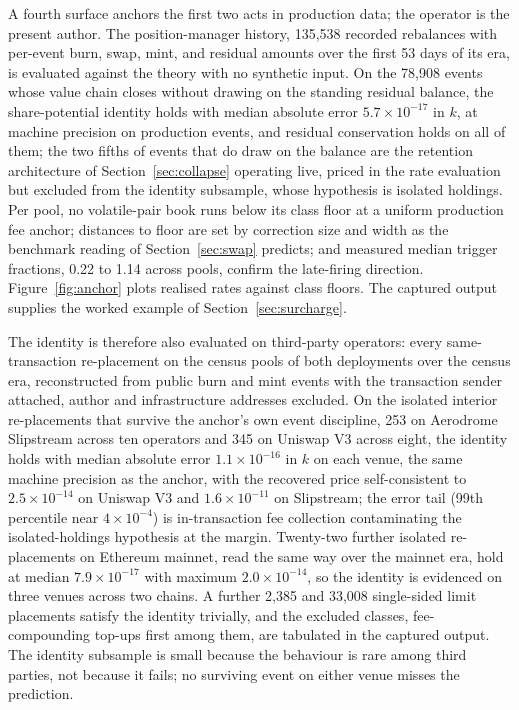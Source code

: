 \documentclass[11pt,a4paper]{article}
\theoremstyle{definition}
\theoremstyle{plain}
\theoremstyle{remark}
\begin{document}
A fourth surface anchors the first two acts in production data; the operator is the present author. The position-manager history, 135{,}538 recorded rebalances with per-event burn, swap, mint, 
and residual amounts over the first 53 days of its era, is evaluated against the theory with no synthetic input. On the 78{,}908 events whose value chain closes without drawing on the standing 
residual balance, the share-potential identity holds with median absolute error $5.7 \times 10^{-17}$ in $k$, at machine precision on production events, and residual conservation holds on all of them; the two 
fifths of events that do draw on the balance are the retention architecture of Section~\ref{sec:collapse} operating live, priced in the rate evaluation but excluded from the identity subsample, whose 
hypothesis is isolated holdings. Per pool, no volatile-pair book runs below its class floor at a uniform production fee anchor; distances to floor are set by correction size and width as the 
benchmark reading of Section~\ref{sec:swap} predicts; and measured median trigger fractions, 0.22 to 1.14 across pools, confirm the late-firing direction. Figure~\ref{fig:anchor} plots realised rates 
against class floors. The captured output supplies the worked example of Section~\ref{sec:surcharge}.

The identity is therefore also evaluated on third-party operators: every same-transaction re-placement on the census pools of both deployments over the census era, reconstructed from public burn 
and mint events with the transaction sender attached, author and infrastructure addresses excluded. On the isolated interior re-placements that survive the anchor's own event discipline, 
253 on Aerodrome Slipstream across ten operators and 345 on Uniswap V3 across eight, the identity holds with median absolute error $1.1 \times 10^{-16}$ in $k$ on each venue, the same machine precision 
as the anchor, with the recovered price self-consistent to $2.5 \times 10^{-14}$ on Uniswap V3 and $1.6 \times 10^{-11}$ on Slipstream; the error tail (99th percentile near $4 \times 10^{-4}$) is 
in-transaction fee collection contaminating the isolated-holdings hypothesis at the margin. Twenty-two further isolated re-placements on Ethereum mainnet, read the same way over the mainnet era, hold at 
median $7.9 \times 10^{-17}$ with maximum $2.0 \times 10^{-14}$, so the identity is evidenced on three venues across two chains. A further 2{,}385 and 33{,}008 single-sided limit placements satisfy 
the identity trivially, and the excluded classes, fee-compounding top-ups first among them, are tabulated in the captured output. The identity subsample is small because the behaviour is rare among 
third parties, not because it fails; no surviving event on either venue misses the prediction.
\end{document}
